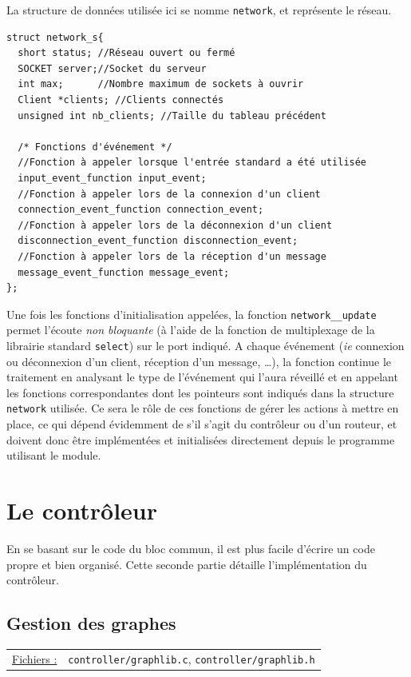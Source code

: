 \documentclass[a4paper,11pt]{article}
\begin{document}
La structure de données utilisée ici se nomme \texttt{network}, et représente le réseau.
\begin{lstlisting}
struct network_s{
  short status; //Réseau ouvert ou fermé
  SOCKET server;//Socket du serveur
  int max;      //Nombre maximum de sockets à ouvrir
  Client *clients; //Clients connectés
  unsigned int nb_clients; //Taille du tableau précédent

  /* Fonctions d'événement */
  //Fonction à appeler lorsque l'entrée standard a été utilisée
  input_event_function input_event;
  //Fonction à appeler lors de la connexion d'un client
  connection_event_function connection_event;
  //Fonction à appeler lors de la déconnexion d'un client
  disconnection_event_function disconnection_event;
  //Fonction à appeler lors de la réception d'un message
  message_event_function message_event;
};
\end{lstlisting}

Une fois les fonctions d'initialisation appelées, la fonction \texttt{network\_\_update} permet l'écoute \textit{non bloquante} (à l'aide de la fonction de multiplexage de la librairie standard \texttt{select}) sur le port indiqué. A chaque événement (\textit{ie} connexion ou déconnexion d'un client, réception d'un message, \dots), la fonction continue le traitement en analysant le type de l'événement qui l'aura réveillé et en appelant les fonctions correspondantes dont les pointeurs sont indiqués dans la structure \texttt{network} utilisée. Ce sera le rôle de ces fonctions de gérer les actions à mettre en place, ce qui dépend évidemment de s'il s'agit du contrôleur ou d'un routeur, et doivent donc être implémentées et initialisées directement depuis le programme utilisant le module.

\section{Le contrôleur}

En se basant sur le code du bloc commun, il est plus facile d'écrire un code propre et bien organisé. Cette seconde partie détaille l'implémentation du contrôleur.

\subsection{Gestion des graphes}

\begin{tabularx}{\linewidth}{lX}
\underline{Fichiers :} & \texttt{controller/graphlib.c}, \texttt{controller/graphlib.h}\\
\end{tabularx}\\
\end{document}
